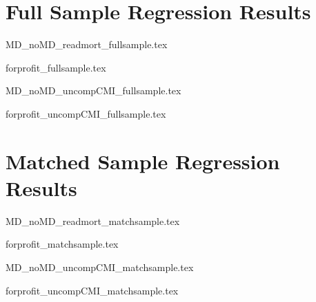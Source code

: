 \documentclass[12pt]{article}
\begin{document}
\section{Full Sample Regression Results}

{MD_noMD_readmort_fullsample.tex}

{forprofit_fullsample.tex}

{MD_noMD_uncompCMI_fullsample.tex}

{forprofit_uncompCMI_fullsample.tex}

\section{Matched Sample Regression Results}

{MD_noMD_readmort_matchsample.tex}

{forprofit_matchsample.tex}

{MD_noMD_uncompCMI_matchsample.tex}

{forprofit_uncompCMI_matchsample.tex}



    

    

    

    

    

    

	
	
	
\end{document}
